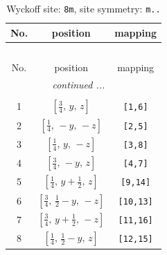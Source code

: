\documentclass[fleqn,8pt]{jsarticle}
\begin{document}
\begin{longtable}{ccc}
\caption{Wyckoff site: {\tt 8m}, site symmetry: {\tt m..}}
 \\
 \hline \hline
No. & position & mapping \\ \hline \endfirsthead

\multicolumn{2}{l}{\tablename\ \thetable{}} \\
 \hline \hline
No. & position & mapping \\ \hline \endhead

 \hline \hline
\multicolumn{2}{r}{\footnotesize\it continued ...} \\ \endfoot

 \hline \hline
\multicolumn{2}{r}{} \\ \endlastfoot

1 & $\left[ \frac{3}{4},\, y,\, z \right]$ & {\tt [1,6]} \\ \hline
2 & $\left[ \frac{1}{4},\, - y,\, - z \right]$ & {\tt [2,5]} \\ \hline
3 & $\left[ \frac{1}{4},\, y,\, - z \right]$ & {\tt [3,8]} \\ \hline
4 & $\left[ \frac{3}{4},\, - y,\, z \right]$ & {\tt [4,7]} \\ \hline
5 & $\left[ \frac{1}{4},\, y + \frac{1}{2},\, z \right]$ & {\tt [9,14]} \\ \hline
6 & $\left[ \frac{3}{4},\, \frac{1}{2} - y,\, - z \right]$ & {\tt [10,13]} \\ \hline
7 & $\left[ \frac{3}{4},\, y + \frac{1}{2},\, - z \right]$ & {\tt [11,16]} \\ \hline
8 & $\left[ \frac{1}{4},\, \frac{1}{2} - y,\, z \right]$ & {\tt [12,15]} \\
\end{longtable}
\renewcommand{\arraystretch}{1.2}
\end{document}
